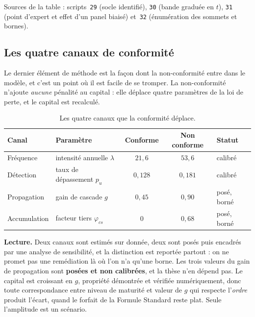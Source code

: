 \documentclass[12pt,a4paper]{article}
\theoremstyle{definition}
\begin{document}
\vspace{4pt}
\noindent Sources de la table : scripts~\texttt{29} (socle identifié),
\texttt{30} (bande graduée en $t$), \texttt{31} (point d'expert et effet d'un
panel biaisé) et~\texttt{32} (énumération des sommets et bornes).

\subsection{Les quatre canaux de conformité}
\label{ss:canaux}

Le dernier élément de méthode est la façon dont la non-conformité entre dans le
modèle, et c'est un point où il est facile de se tromper. La non-conformité
n'ajoute \emph{aucune} pénalité au capital : elle déplace quatre paramètres de la
loi de perte, et le capital est recalculé.

\begin{table}[htbp]
\centering\small
\renewcommand{\arraystretch}{1.2}
\begin{tabular}{@{}llccl@{}}
\toprule
\textbf{Canal} & \textbf{Paramètre} & \textbf{Conforme} & \textbf{Non conforme}
& \textbf{Statut} \\
\midrule
Fréquence     & intensité annuelle $\lambda$      & $21{,}6$ & $53{,}6$ & calibré \\
Détection     & taux de dépassement $p_u$         & $0{,}128$ & $0{,}181$ & calibré \\
Propagation   & gain de cascade $g$               & $0{,}45$ & $0{,}90$ & posé, borné \\
Accumulation  & facteur tiers $\varphi_{cs}$      & $0$ & $0{,}68$ & posé, borné \\
\bottomrule
\end{tabular}
\caption{Les quatre canaux que la conformité déplace.}
\label{tab:canaux}
\end{table}

\textbf{Lecture.} Deux canaux sont estimés sur donnée, deux sont posés puis
encadrés par une analyse de sensibilité, et la distinction est reportée partout :
on ne promet pas une remédiation là où l'on n'a qu'une borne. Les trois valeurs du
gain de propagation sont \textbf{posées et non calibrées}, et la thèse n'en dépend
pas. Le capital est croissant en $g$, propriété démontrée et vérifiée
numériquement, donc toute correspondance entre niveau de maturité et valeur de $g$
qui respecte l'\emph{ordre} produit l'écart, quand le forfait de la Formule
Standard reste plat. Seule l'amplitude est un scénario.
\end{document}
